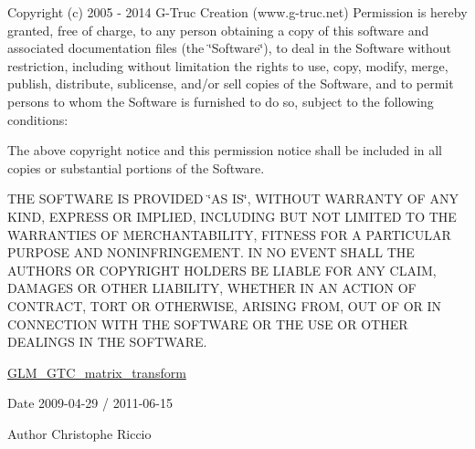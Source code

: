 Copyright (c) 2005 -\/ 2014 G-\/\+Truc Creation (www.\+g-\/truc.\+net) Permission is hereby granted, free of charge, to any person obtaining a copy of this software and associated documentation files (the \char`\"{}\+Software\char`\"{}), to deal in the Software without restriction, including without limitation the rights to use, copy, modify, merge, publish, distribute, sublicense, and/or sell copies of the Software, and to permit persons to whom the Software is furnished to do so, subject to the following conditions\+:

The above copyright notice and this permission notice shall be included in all copies or substantial portions of the Software.

T\+HE S\+O\+F\+T\+W\+A\+RE IS P\+R\+O\+V\+I\+D\+ED \char`\"{}\+A\+S I\+S\char`\"{}, W\+I\+T\+H\+O\+UT W\+A\+R\+R\+A\+N\+TY OF A\+NY K\+I\+ND, E\+X\+P\+R\+E\+SS OR I\+M\+P\+L\+I\+ED, I\+N\+C\+L\+U\+D\+I\+NG B\+UT N\+OT L\+I\+M\+I\+T\+ED TO T\+HE W\+A\+R\+R\+A\+N\+T\+I\+ES OF M\+E\+R\+C\+H\+A\+N\+T\+A\+B\+I\+L\+I\+TY, F\+I\+T\+N\+E\+SS F\+OR A P\+A\+R\+T\+I\+C\+U\+L\+AR P\+U\+R\+P\+O\+SE A\+ND N\+O\+N\+I\+N\+F\+R\+I\+N\+G\+E\+M\+E\+NT. IN NO E\+V\+E\+NT S\+H\+A\+LL T\+HE A\+U\+T\+H\+O\+RS OR C\+O\+P\+Y\+R\+I\+G\+HT H\+O\+L\+D\+E\+RS BE L\+I\+A\+B\+LE F\+OR A\+NY C\+L\+A\+IM, D\+A\+M\+A\+G\+ES OR O\+T\+H\+ER L\+I\+A\+B\+I\+L\+I\+TY, W\+H\+E\+T\+H\+ER IN AN A\+C\+T\+I\+ON OF C\+O\+N\+T\+R\+A\+CT, T\+O\+RT OR O\+T\+H\+E\+R\+W\+I\+SE, A\+R\+I\+S\+I\+NG F\+R\+OM, O\+UT OF OR IN C\+O\+N\+N\+E\+C\+T\+I\+ON W\+I\+TH T\+HE S\+O\+F\+T\+W\+A\+RE OR T\+HE U\+SE OR O\+T\+H\+ER D\+E\+A\+L\+I\+N\+GS IN T\+HE S\+O\+F\+T\+W\+A\+RE.

\hyperlink{group__gtc__matrix__transform}{G\+L\+M\+\_\+\+G\+T\+C\+\_\+matrix\+\_\+transform}

\begin{DoxyDate}{Date}
2009-\/04-\/29 / 2011-\/06-\/15 
\end{DoxyDate}
\begin{DoxyAuthor}{Author}
Christophe Riccio 
\end{DoxyAuthor}
